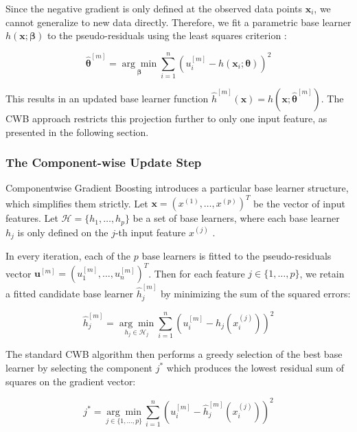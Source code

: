 \documentclass[fontsize=12 pt]{scrartcl}
\begin{document}
Since the negative gradient is only defined at the observed data points $\mathbf{x}_i$, we cannot generalize to new data directly. Therefore, we fit a parametric base learner $h(\mathbf{x}; \boldsymbol{\beta})$ to the pseudo-residuals using the least squares criterion \citep{friedman2001greedy}:

\begin{equation}
    \hat{\boldsymbol{\theta}}^{[m]} = \underset{\boldsymbol{\beta}}{\arg \min} \sum_{i=1}^n \left( u_i^{[m]} - h(\mathbf{x}_i; \boldsymbol{\theta}) \right)^2
\end{equation}

This results in an updated base learner function $\hat{h}^{[m]}(\mathbf{x}) = h(\mathbf{x}; \hat{\boldsymbol{\theta}}^{[m]})$. The CWB approach restricts this projection further to only one input feature, as presented in the following section.

\subsubsection{The Component-wise Update Step}

Componentwise Gradient Boosting introduces a particular base learner structure, which simplifies them strictly. Let $\mathbf{x} = (x^{(1)}, \dots, x^{(p)})^T$ be the vector of input features. Let $\mathcal{H} = \{h_1, \dots, h_p\}$ be a set of base learners, where each base learner $h_j$ is only defined on the $j$-th input feature $x^{(j)}$ \citep{schmid2008boosting}.

In every iteration, each of the $p$ base learners is fitted to the pseudo-residuals vector $\mathbf{u}^{[m]} = (u_1^{[m]}, \dots, u_n^{[m]})^T$. Then for each feature $j \in \{1, \dots, p\}$, we retain a fitted candidate base learner $\hat{h}_j^{[m]}$ by minimizing the sum of the squared errors:

\begin{equation}
    \hat{h}_j^{[m]} = \underset{h_j \in \mathcal{H}_j}{\arg \min} \sum_{i=1}^n \left( u_i^{[m]} - h_j(x_i^{(j)}) \right)^2
\end{equation}

The standard CWB algorithm then performs a greedy selection of the best base learner by selecting the component $j^*$ which produces the lowest residual sum of squares on the gradient vector: 

\begin{equation}
    j^* = \underset{j \in \{1, \dots, p\}}{\arg \min} \sum_{i=1}^n \left( u_i^{[m]} - \hat{h}_j^{[m]}(x_i^{(j)}) \right)^2
\end{equation}
\end{document}
